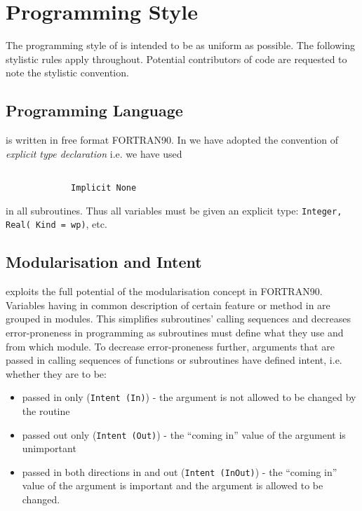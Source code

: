 \section{Programming Style}

The programming style of \D is intended to be as uniform as
possible.  The following stylistic rules apply throughout.
Potential contributors of code are requested to note the stylistic
convention.

\subsection{Programming Language}

\D is written in free format FORTRAN90.  In \D
we have adopted the convention of {\em explicit type declaration}
i.e. we have used
\begin{lstlisting}

             Implicit None

\end{lstlisting}
in all subroutines.  Thus all variables must be given an explicit
type: {\tt Integer, Real( Kind = wp)}, etc.

\subsection{Modularisation and Intent}

\D exploits the full potential of the modularisation concept in
FORTRAN90.  Variables having in common description of certain
feature or method in \D are grouped in modules.  This simplifies
subroutines' calling sequences and decreases error-proneness in
programming as subroutines must define what they use and from
which module.  To decrease error-proneness further, arguments that
are passed in calling sequences of functions or subroutines have
defined intent, i.e. whether they are to be:
\begin{itemize}
\item passed in only ({\tt Intent (In)}) - the argument is not
allowed to be changed by the routine
\item passed out only ({\tt Intent (Out)}) - the ``coming in''
value of the argument is unimportant
\item passed in both directions in and out ({\tt Intent (InOut)})
- the ``coming in'' value of the argument is important and the
argument is allowed to be changed.
\end{itemize}

